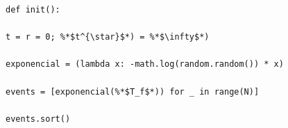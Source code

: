 \documentclass[10pt,a4paper]{article} %
\begin{document}
                                                                                                                                                                                                                                                                                                                                                                            \begin{lstlisting}[caption=Pseudo-c\'odigo del las funciones auxiliares.]
                                                                                                                                                                                                                                                                                                                                                                            def init():
                                                                                                                                                                                                                                                                                                                                                                                t = r = 0; %*$t^{\star}$*) = %*$\infty$*)
                                                                                                                                                                                                                                                                                                                                                                                    exponencial = (lambda x: -math.log(random.random()) * x)
                                                                                                                                                                                                                                                                                                                                                                                        events = [exponencial(%*$T_f$*)) for _ in range(N)]
                                                                                                                                                                                                                                                                                                                                                                                            events.sort()
                                                                                                                                                                                                                                                                                                                                                                                                \end{lstlisting}
                                                                                                                                                                                                                                                                                                                                                                                                    
\end{document}
